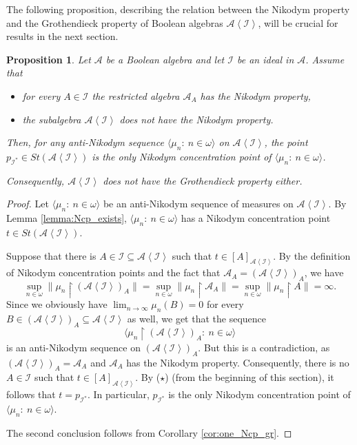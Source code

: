 \documentclass[a4paper,11pt,fleqn]{amsart}
\newtheorem{proposition}[theorem]{Proposition}
\theoremstyle{definition}
\theoremstyle{remark}
\numberwithin{equation}{section}
\newcommand{\N}{\mathbb{N}}
\newcommand{\aA}{\mathcal{A}}
\newcommand{\iI}{\mathcal{I}}
\newcommand{\rstr}{\restriction}
\newcommand{\sub}{\subseteq}
\newcommand{\seqn}[1]{\big\langle#1\colon\ n\io\big\rangle}
\newcommand{\gen}[1]{\mathopen{}\left\langle#1\mathclose{}\right\rangle}
\newcommand{\clopen}[1]{\left[#1\right]}
\newcommand{\io}{\in\omega}%
\begin{document}

The following proposition, describing the relation between the Nikodym property and the Grothendieck property of Boolean algebras $\aA\gen{\iI}$, will be crucial for results in the next section.

\begin{proposition}\label{prop:ai_uniq_concentr_point}
    Let $\aA$ be a Boolean algebra and let $\iI$ be an ideal in $\aA$. Assume that
    \begin{itemize}
        \item for every $A\in\iI$ the restricted algebra $\aA_A$ has the Nikodym property,
        \item the subalgebra $\aA\gen{\iI}$ does not have the Nikodym property. 
    \end{itemize}
    Then, for any anti-Nikodym sequence $\seqn{\mu_n}$ on $\aA\gen{\iI}$, the point $p_{\iI^*}\in St(\aA\gen{\iI})$ is the only Nikodym concentration point of $\seqn{\mu_n}$. 
    
    Consequently, $\aA\gen{\iI}$ does not have the Grothendieck property either.
\end{proposition}
\begin{proof}  
    Let $\seqn{\mu_n}$ be an anti-Nikodym sequence of measures on $\aA\gen{\iI}$. By Lemma \ref{lemma:Ncp_exists}, $\seqn{\mu_n}$ has a Nikodym concentration point $t\in St(\aA\gen{\iI})$.
    
    Suppose that there is $A\in\iI\sub\aA\gen{\iI}$ such that $t\in\clopen{A}_{\aA\gen{\iI}}$. By the definition of Nikodym concentration points and the fact that $\aA_A=(\aA\gen{\iI})_A$, we have
    \[\sup_{n\io}\big\|\mu_n\rstr(\aA\gen{\iI})_A\big\|=\sup_{n\io}\big\|\mu_n\rstr\aA_A\big\|=\sup_{n\io}\big\|\mu_n\rstr A\big\|=\infty.\]
    Since we obviously have $\lim_{n\to\infty}\mu_n(B)=0$ for every $B\in(\aA\gen{\iI})_A\sub\aA\gen{\iI}$ as well, we get that the sequence
    \[\seqn{\mu_n\rstr(\aA\gen{\iI})_A}\]
    is an anti-Nikodym sequence on $(\aA\gen{\iI})_A$. But this is a contradiction, as $(\aA\gen{\iI})_A=\aA_A$ and $\aA_A$ has the Nikodym property. Consequently, there is no $A\in\iI$ such that $t\in\clopen{A}_{\aA\gen{\iI}}$. By ($\star$) (from the beginning of this section), it follows that $t=p_{\iI^*}$. In particular, $p_{\iI^*}$ is the only Nikodym concentration point of $\seqn{\mu_n}$.

    The second conclusion follows from Corollary \ref{cor:one_Ncp_gr}.
\end{proof}
\end{document}
